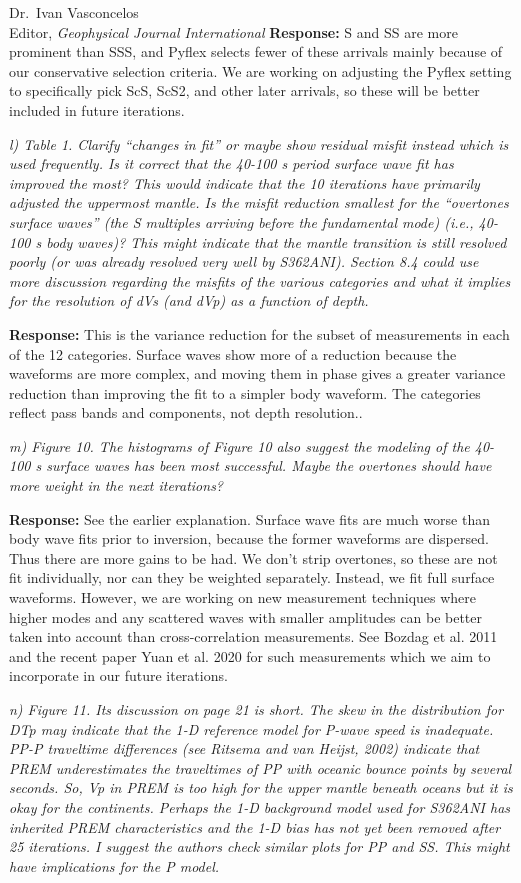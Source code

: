 \documentclass[11pt,a4paper]{letter}
\newcommand{\response}[1]{\textbf{Response:} #1}
\newcommand{\rev}[1]{{\it{#1}}}
\begin{document}
\begin{letter}{Dr.~Ivan Vasconcelos\\
Editor, \textit{Geophysical Journal International}}
\response{S and SS are more prominent than SSS, and Pyflex selects fewer of these arrivals mainly because of our conservative selection criteria. We are working on adjusting the Pyflex setting to specifically pick ScS, ScS2, and other later arrivals, so these will be better included in future iterations.}

\rev{l) Table 1. Clarify ``changes in fit'' or maybe show residual misfit instead which is used frequently. Is it correct that the 40-100 s period surface wave fit has improved the most? This would indicate that the 10 iterations have primarily adjusted the uppermost mantle.
Is the misfit reduction smallest for the ``overtones surface waves'' (the S multiples arriving before the fundamental mode) (i.e., 40-100 s body waves)?
This might indicate that the mantle transition is still resolved poorly (or was already resolved very well by S362ANI).
Section 8.4 could use more discussion regarding the misfits of the various categories and what it implies for the resolution of dVs (and dVp) as a function of depth.
}

\response{This is the variance reduction for the subset of measurements in each of the 12 categories. Surface waves show more of a reduction because the waveforms are more complex, and moving them in phase gives a greater variance reduction than improving the fit to a simpler body waveform. The categories reflect pass bands and components, not depth resolution..}

\rev{m) Figure 10. The histograms of Figure 10 also suggest the modeling of the 40-100 s surface waves has been most successful. Maybe the overtones should have more weight in the next iterations?
}

\response{See the earlier explanation.
Surface wave fits are much worse than body wave fits prior to inversion, because the former waveforms are dispersed.
Thus there are more gains to be had. We don't strip overtones, so these are not fit individually, nor can they be weighted separately.
Instead, we fit full surface waveforms. However, we are working on new measurement techniques where higher modes and any scattered waves with smaller amplitudes can be better taken into account than cross-correlation measurements. See Bozdag et al. 2011 and the recent paper Yuan et al. 2020 for such measurements which we aim to incorporate in our future iterations. 
}

\rev{n) Figure 11. Its discussion on page 21 is short. The skew in the distribution for DTp may indicate that the 1-D reference model for P-wave speed is inadequate. PP-P traveltime differences (see Ritsema and van Heijst, 2002) indicate that PREM underestimates the traveltimes of PP with oceanic bounce points by several seconds.
So, Vp in PREM is too high for the upper mantle beneath oceans but it is okay for the continents. Perhaps the 1-D background model used for S362ANI has inherited PREM characteristics and the 1-D bias has not yet been removed after 25 iterations.
I suggest the authors check similar plots for PP and SS. This might have implications for the P model.
}


\end{letter}
\end{document}

